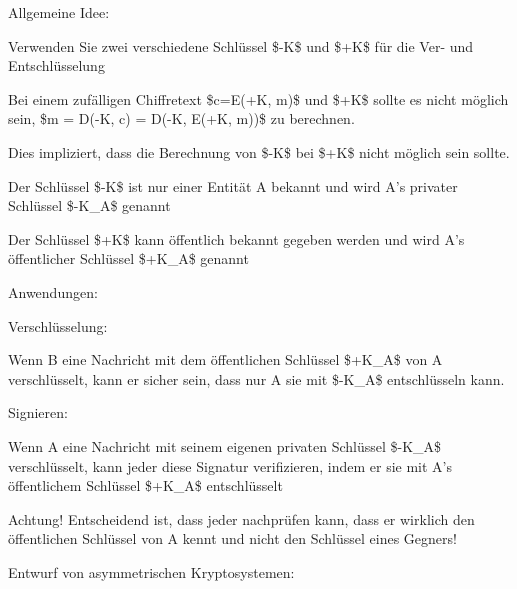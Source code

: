 \documentclass[a4paper]{article}
\begin{document}
\begin{multicols}{3}
      \begin{itemize*}
            \item
            Allgemeine Idee:

            \begin{itemize*}
                  \item Verwenden Sie zwei verschiedene Schlüssel \$-K\$ und \$+K\$ für die Ver- und Entschlüsselung
                  \item Bei einem zufälligen Chiffretext \$c=E(+K, m)\$ und \$+K\$ sollte es nicht möglich sein, \$m = D(-K, c) = D(-K, E(+K, m))\$ zu berechnen.
                  \begin{itemize*} \item Dies impliziert, dass die Berechnung von \$-K\$ bei \$+K\$ nicht möglich sein sollte. \end{itemize*}
                  \item Der Schlüssel \$-K\$ ist nur einer Entität A bekannt und wird A's privater Schlüssel \$-K\_A\$ genannt
                  \item Der Schlüssel \$+K\$ kann öffentlich bekannt gegeben werden und wird A's öffentlicher Schlüssel \$+K\_A\$ genannt
            \end{itemize*}
            \item
            Anwendungen:

            \begin{itemize*}
                  \item Verschlüsselung:
                  \begin{itemize*} \item Wenn B eine Nachricht mit dem öffentlichen Schlüssel \$+K\_A\$ von A verschlüsselt, kann er sicher sein, dass nur A sie mit \$-K\_A\$ entschlüsseln kann. \end{itemize*}
                  \item Signieren:
                  \begin{itemize*} \item Wenn A eine Nachricht mit seinem eigenen privaten Schlüssel \$-K\_A\$ verschlüsselt, kann jeder diese Signatur verifizieren, indem er sie mit A's öffentlichem Schlüssel \$+K\_A\$ entschlüsselt \end{itemize*}
                  \item Achtung! Entscheidend ist, dass jeder nachprüfen kann, dass er wirklich den öffentlichen Schlüssel von A kennt und nicht den Schlüssel eines Gegners!
            \end{itemize*}
            \item
            Entwurf von asymmetrischen Kryptosystemen:


\end{itemize*}
\end{multicols}
\end{document}
